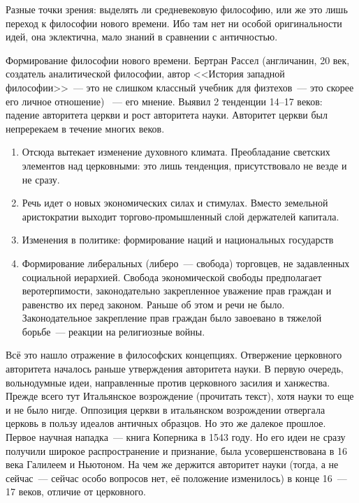 Разные точки зрения: выделять ли средневековую философию, или же это лишь переход к философии нового времени. Ибо там нет ни особой оригинальности идей, она эклектична, мало знаний в сравнении с античностью.

Формирование философии нового времени.
Бертран Рассел (англичанин, 20 век, создатель аналитической философии, автор <<История западной философии>>~--- это не слишком классный учебник для физтехов~--- это скорее его личное отношение) ~--- его мнение.
Выявил 2 тенденции 14--17 веков: падение авторитета церкви и рост авторитета науки. Авторитет церкви был непререкаем в течение многих веков. 

\begin{enumerate}
	\item Отсюда вытекает изменение духовного климата. Преобладание светских элементов над церковными: это лишь тенденция, присутствовало не везде и не сразу. 
	\item Речь идет о новых экономических силах и стимулах. Вместо земельной аристократии выходит торгово-промышленный слой держателей капитала.
	\item Изменения в политике: формирование наций и национальных государств
	\item Формирование либеральных (либеро~--- свобода) торговцев, не задавленных социальной иерархией. Свобода экономической свободы предполагает веротерпимости, законодательно закрепленное уважение прав граждан и равенство их перед законом. Раньше об этом и речи не было. Законодательное закрепление прав граждан было завоевано в тяжелой борьбе~--- реакции на религиозные войны.
\end{enumerate}
Всё это нашло отражение в философских концепциях. Отвержение церковного авторитета началось раньше утверждения авторитета науки. В первую очередь, вольнодумные идеи, направленные против церковного засилия и ханжества. Прежде всего тут Итальянское возрождение (прочитать текст), хотя науки то еще и не было нигде. Оппозиция церкви в итальянском возрождении отвергала церковь в пользу идеалов античных образцов. Но это же далекое прошлое. Первое научная нападка~--- книга Коперника в 1543 году. Но его идеи не сразу получили широкое распространение и признание, была усовершенствована в 16 века Галилеем и Ньютоном. 
На чем же держится авторитет науки (тогда, а не сейчас~--- сейчас особо вопросов нет, её положение изменилось) в конце 16~--- 17 веков, отличие от церковного.

